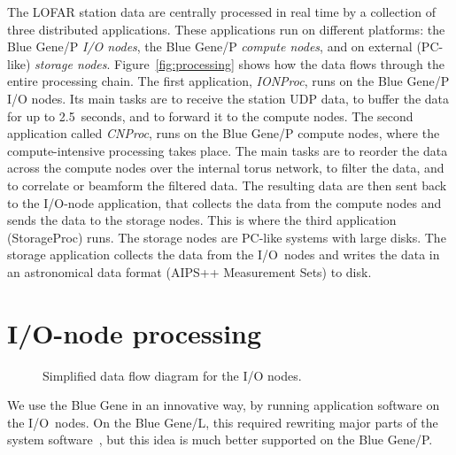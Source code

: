 \documentclass[10pt]{article}
\begin{document}
The LOFAR station data are centrally processed in real time by a collection
of three distributed applications.
These applications run on different platforms:
the Blue Gene/P \emph{I/O nodes}, the Blue Gene/P \emph{compute nodes}, and on
external (PC-like) \emph{storage nodes}.
Figure~\ref{fig:processing} shows how the data flows through the entire
processing chain.
The first application, \emph{IONProc}, runs on the Blue Gene/P I/O nodes.
Its main tasks are to receive the station UDP data, to buffer the data
for up to 2.5~seconds, and to forward it to the compute nodes.
The second application called \emph{CNProc}, runs on the Blue Gene/P compute nodes, where the
compute-intensive processing takes place.
The main tasks are to reorder the data across the compute nodes over the
internal torus network, to filter the data, and to correlate or beamform
the filtered data.
The resulting data are then sent back to the I/O-node application, that
collects the data from the compute nodes and
sends the data to the storage nodes.
This is where the third application (StorageProc) runs.
The storage nodes are PC-like systems with large disks.
The storage application collects the data from the I/O~nodes and writes the
data in an astronomical data format (AIPS++ Measurement Sets) to disk.



\section{I/O-node processing}
\label{sec:I/O-node-processing}

\begin{figure}[t]
\caption{Simplified data flow diagram for the I/O nodes.}
\label{fig:ion-processing}
\end{figure}

We use the Blue Gene in an innovative way, by running application software
on the I/O~nodes.
On the Blue Gene/L, this required rewriting major parts of the system
software~\cite{Iskra:08}, but this idea is much better supported on the
Blue Gene/P.
\end{document}
